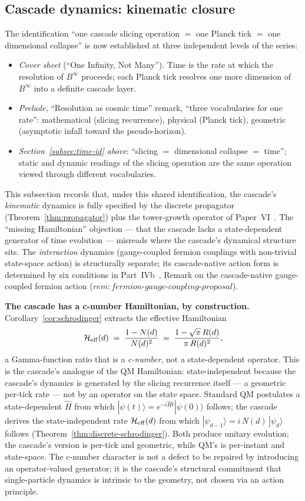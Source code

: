 \documentclass[12pt,a4paper]{article}
\begin{document}
\subsection{Cascade dynamics: kinematic closure}\label{subsec:dynamics-closure}

The identification ``one cascade slicing operation $=$ one Planck tick
$=$ one dimensional collapse'' is now established at three independent
levels of the series:
\begin{itemize}[nosep]
\item \emph{Cover sheet} (``One Infinity, Not Many''). Time is the rate
at which the resolution of $B^\infty$ proceeds; each Planck tick
resolves one more dimension of $B^\infty$ into a definite cascade
layer.
\item \emph{Prelude}, ``Resolution as cosmic time'' remark, ``three
vocabularies for one rate'': mathematical (slicing recurrence),
physical (Planck tick), geometric (asymptotic infall toward the
pseudo-horizon).
\item \emph{Section~\ref{subsec:time-id} above}: ``slicing $=$
dimensional collapse $=$ time''; static and dynamic readings of the
slicing operation are the same operation viewed through different
vocabularies.
\end{itemize}
This subsection records that, under this shared identification, the
cascade's \emph{kinematic} dynamics is fully specified by the discrete
propagator (Theorem~\ref{thm:propagator}) plus the tower-growth
operator of Paper~VI~\cite{part6}. The ``missing Hamiltonian''
objection --- that the cascade lacks a state-dependent generator of
time evolution --- misreads where the cascade's dynamical structure
sits. The \emph{interaction} dynamics (gauge-coupled fermion couplings
with non-trivial state-space action) is structurally separate; its
cascade-native action form is determined by six conditions in
Part~IVb~\cite{part4b}, Remark on the cascade-native gauge-coupled
fermion action
($\mathit{rem{:}fermion\text{-}gauge\text{-}coupling\text{-}proposal}$).

\medskip\noindent\textbf{The cascade has a c-number Hamiltonian, by
construction.} Corollary~\ref{cor:schrodinger} extracts the effective
Hamiltonian
\[
\mathcal{H}_{\rm eff}(d) \;=\; \frac{1 - N(d)}{N(d)^2}
\;=\; \frac{1 - \sqrt{\pi}\,R(d)}{\pi\,R(d)^2},
\]
a Gamma-function ratio that is a \emph{c-number}, not a state-dependent
operator. This is the cascade's analogue of the QM Hamiltonian:
state-independent because the cascade's dynamics is generated by the
slicing recurrence itself --- a geometric per-tick rate --- not by an
operator on the state space. Standard QM postulates a state-dependent
$\hat H$ from which $|\psi(t)\rangle = e^{-i\hat H t}|\psi(0)\rangle$
follows; the cascade derives the state-independent rate
$\mathcal{H}_{\rm eff}(d)$ from which
$|\psi_{d-1}\rangle = i\,N(d)\,|\psi_d\rangle$ follows
(Theorem~\ref{thm:discrete-schrodinger}). Both produce unitary
evolution; the cascade's version is per-tick and geometric, while QM's
is per-instant and state-space. The c-number character is not a defect
to be repaired by introducing an operator-valued generator; it is the
cascade's structural commitment that single-particle dynamics is
intrinsic to the geometry, not chosen via an action principle.
\end{document}
